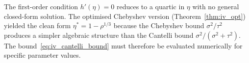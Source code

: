 \begin{remark}
    \label{rem:cantelli_noform}
    The first-order condition $h'(\eta)=0$ reduces to a quartic in $\eta$ with no general closed-form solution. The optimised Chebyshev version (Theorem~\ref{thm:iv_opt}) yielded the clean form $\eta^*=1-\rho^{1/3}$ because the Chebyshev bound $\sigma^2/\tau^2$ produces a simpler algebraic structure than the Cantelli bound $\sigma^2/(\sigma^2+\tau^2)$. The bound~\eqref{eq:iv_cantelli_bound} must therefore be evaluated numerically for specific parameter values.
\end{remark}
